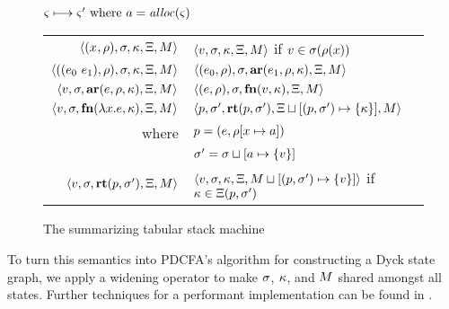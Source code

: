 \documentclass{llncs}
\begin{document}
\begin{figure}
  \centering
  $\varsigma \longmapsto \varsigma' \text{ where } a = \mathit{alloc}(\varsigma)$ \\
  \begin{tabular}{r|l}
    \hline
    $\langle (x^{{}}, \rho), \sigma, \kappa, \Xi, M \rangle$
    &
    $\langle v,\sigma,\kappa, \Xi, M \rangle$ if $v \in \sigma(\rho(x))$
    \\
    $\langle ((e_{0}\ e_{1}){}, \rho), \sigma, \kappa, \Xi, M \rangle$
    &
    $\langle (e_{0}, \rho), \sigma, \mathbf{ar}{}(e_{1},\rho,\kappa), \Xi, M \rangle$
    \\
    $\langle v, \sigma, \mathbf{ar}{}(e,\rho,\kappa), \Xi, M \rangle$
    &
    $\langle (e, \rho), \sigma, \mathbf{fn}{}(v, \kappa), \Xi, M \rangle$
    \\
    $\langle v,\sigma,\mathbf{fn}{}(\lambda{} x. e, \kappa),\Xi,M \rangle$
    & %
    $\langle p,
          \sigma',
          \mathbf{rt}(p, \sigma'),
          \Xi\sqcup[(p, \sigma') \mapsto \{ \kappa \}],
          M \rangle$
    \\ %
    where & $p = (e, \rho[x \mapsto a])$ \\
          & $\sigma' = \sigma\sqcup[a \mapsto \{ v \}]$
    \\
    $\langle v, \sigma, \mathbf{rt}(p,\sigma'), \Xi, M \rangle$
    &
    $\langle v, \sigma, \kappa, \Xi, M\sqcup[(p, \sigma') \mapsto \{ v \}] \rangle$
    if $\kappa \in \Xi(p, \sigma')$
  \end{tabular}
  \caption{The summarizing tabular stack machine}
  \label{fig:summary-semantics}
\end{figure}

To turn this semantics into PDCFA's algorithm for constructing a Dyck
state graph, we apply a widening operator to make $\sigma$, $\kappa$,
and $M$ shared amongst all states. Further techniques for a
performant implementation can be found in
\citet{ianjohnson:oaam:2013}.
\end{document}
